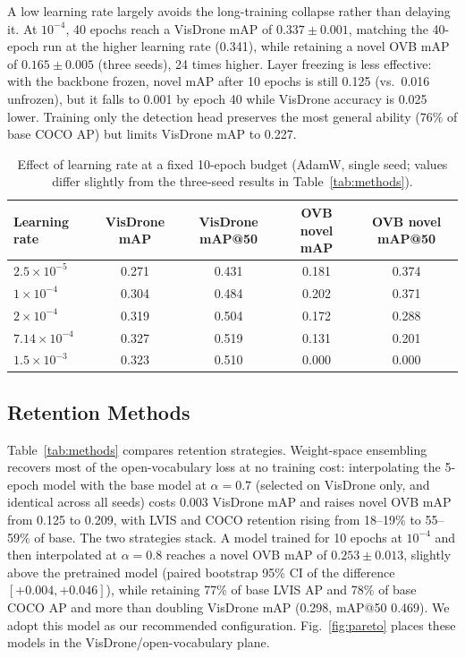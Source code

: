 \documentclass[conf]{new-aiaa}
\begin{document}
A low learning rate largely avoids the long-training collapse rather than delaying it. At
$10^{-4}$, 40 epochs reach a VisDrone mAP of $0.337 \pm 0.001$, matching the 40-epoch run at
the higher learning rate (0.341), while retaining a novel OVB mAP of $0.165 \pm 0.005$ (three
seeds), 24 times higher. Layer freezing is less effective: with the backbone frozen, novel mAP
after 10 epochs is still 0.125 (vs.\ 0.016 unfrozen), but it falls to 0.001 by epoch 40 while
VisDrone accuracy is 0.025 lower. Training only the detection head preserves the most general
ability (76\% of base COCO AP) but limits VisDrone mAP to 0.227.

\begin{table}[hbt!]
\caption{Effect of learning rate at a fixed 10-epoch budget (AdamW, single seed; values
         differ slightly from the three-seed results in Table~\ref{tab:methods}).}
\label{tab:lrgrid}
\centering
\begin{tabular}{lcccc}
\hline
\textbf{Learning rate} & \textbf{VisDrone mAP} & \textbf{VisDrone mAP@50} & \textbf{OVB novel mAP} & \textbf{OVB novel mAP@50} \\
\hline
$2.5\times10^{-5}$ & 0.271 & 0.431 & 0.181 & 0.374 \\
$1\times10^{-4}$   & 0.304 & 0.484 & 0.202 & 0.371 \\
$2\times10^{-4}$   & 0.319 & 0.504 & 0.172 & 0.288 \\
$7.14\times10^{-4}$ & 0.327 & 0.519 & 0.131 & 0.201 \\
$1.5\times10^{-3}$ & 0.323 & 0.510 & 0.000 & 0.000 \\
\hline
\end{tabular}
\end{table}

\subsection{Retention Methods}

Table~\ref{tab:methods} compares retention strategies. Weight-space ensembling recovers most
of the open-vocabulary loss at no training cost: interpolating the 5-epoch model with the base
model at $\alpha = 0.7$ (selected on VisDrone only, and identical across all seeds) costs 0.003
VisDrone mAP and raises novel OVB mAP from 0.125 to 0.209, with LVIS and COCO retention rising
from 18--19\% to 55--59\% of base. The two strategies stack. A model trained for 10 epochs at
$10^{-4}$ and then interpolated at $\alpha = 0.8$ reaches a novel OVB mAP of
$0.253 \pm 0.013$, slightly above the pretrained model (paired bootstrap 95\% CI of the
difference $[+0.004, +0.046]$), while retaining 77\% of base LVIS AP and 78\% of base COCO AP
and more than doubling VisDrone mAP (0.298, mAP@50 0.469). We adopt this model as our
recommended configuration. Fig.~\ref{fig:pareto} places these models in the
VisDrone/open-vocabulary plane.
\end{document}
